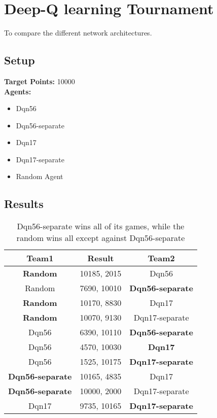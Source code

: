\section{Deep-Q learning Tournament}
\label{sec:nnexp}
To compare the different network architectures.
\subsection*{Setup}
\textbf{Target Points:} 10000\\
\textbf{Agents:}
\begin{itemize}
    \setlength\itemsep{5px}
    \item Dqn56
    \item Dqn56-separate
    \item Dqn17
    \item Dqn17-separate
    \item Random Agent
\end{itemize}

\subsection*{Results}
\begin{table}[h!]
  \centering

  \begin{tabular}{ccc}
    \textbf{Team1} & \textbf{Result}  & \textbf{Team2}\\
    \hline
    \textbf{Random} & 10185, 2015  & Dqn56\\
    \hline
    Random & 7690, 10010  & \textbf{Dqn56-separate}\\
    \hline
    \textbf{Random} &  10170, 8830 & Dqn17\\
    \hline
    \textbf{Random} & 10070, 9130  & Dqn17-separate\\
    \hline

    Dqn56 & 6390, 10110  & \textbf{Dqn56-separate}\\
    \hline
    Dqn56 & 4570, 10030  & \textbf{Dqn17}\\
    \hline
    Dqn56 & 1525, 10175  & \textbf{Dqn17-separate}\\
    \hline

    \textbf{Dqn56-separate} &  10165, 4835 & Dqn17\\
    \hline
    \textbf{Dqn56-separate} & 10000, 2000  & Dqn17-separate\\
    \hline

    Dqn17 & 9735, 10165  & \textbf{Dqn17-separate}\\
    \hline
  \end{tabular}
  \caption[Result of the Q-learning Tournament]{Dqn56-separate wins all of its games, while the random wins all except against Dqn56-separate}
\end{table}

